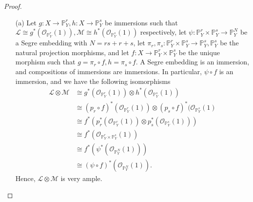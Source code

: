 \documentclass{article}
\newcommand{\fL}{\mathcal{L}}
\newcommand{\fM}{\mathcal{M}}
\newcommand{\fO}{\mathcal{O}}
\newcommand{\PP}{\mathbb{P}}
\begin{document}
\begin{enumerate} [label=\textbf{\arabic*.}, leftmargin=0em]
\begin{proof} $ $ \vspace{0pt}
    \begin{itemize} [leftmargin=0cm]
        \item[(a)] Let $g : X \to \PP_Y^r, h : X \to \PP_Y^s$ be immersions such that $\fL \cong g^* (\fO_{\PP_Y^r}(1)), \fM \cong h^*(\fO_{\PP_Y^s}(1))$ respectively, let $\psi : \PP_Y^r \times \PP_Y^s \to \PP_Y^N$ be a Segre embedding with $N = rs + r + s$, let $\pi_r, \pi_s : \PP_Y^r \times \PP_Y^s \to \PP_Y^s, \PP_Y^s$ be the natural projection morphisms, and let $f : X \to \PP_Y^r \times \PP_Y^s$ be the unique morphism such that $g = \pi_r \circ f, h = \pi_s \circ f$. A Segre embedding is an immersion, and compositions of immersions are immersions. In particular, $\psi \circ f$ is an immersion, and we have the following isomorphisms
        \begin{align*}
            \fL \otimes \fM & \cong g^*(\fO_{\PP_Y^r}(1)) \otimes h^*(\fO_{\PP_Y^s}(1)) \\
            & \cong (p_r \circ f)^*(\fO_{\PP_Y^r}(1)) \otimes (p_s \circ f)^*(\fO_{\PP_Y^s}(1) \\
            & \cong f^*(p_r^*(\fO_{\PP_Y^r}(1)) \otimes p_s^*(\fO_{\PP_Y^s}(1))) \\
            & \cong f^* (\fO_{\PP_Y^r \times \PP_Y^s}(1)) \\
            & \cong f^*(\psi^* (\fO_{\PP_Y^N}(1))) \\
            & \cong (\psi \circ f)^*(\fO_{\PP_Y^N}(1)).
        \end{align*}
        Hence, $\fL \otimes \fM$ is very ample.


\end{itemize}
\end{proof}
\end{enumerate}
\end{document}
